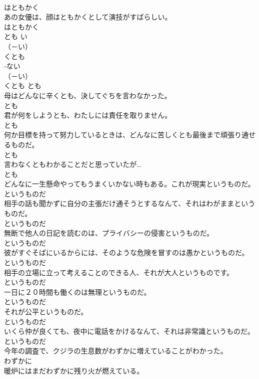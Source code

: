 \documentclass[8pt]{extreport}
\begin{document}
\begin{CJK}{UTF8}{min}
\\	はともかく
\\	あの女優は、顔はともかくとして演技がすばらしい。	
\\	はともかく
\\	とも	い
\\	（－い） 
\\	くとも	
\\	-ない
\\	（－い） 
\\	くとも	とも
\\	母はどんなに辛くとも、決してぐちを言わなかった。	
\\	とも
\\	君が何をしようとも、わたしには責任を取りません。	
\\	とも
\\	何か目標を持って努力しているときは、どんなに苦しくとも最後まで頑張り通せるものだ。	
\\	とも
\\	言わなくともわかることだと思っていたが…	
\\	とも
\\	どんなに一生懸命やってもうまくいかない時もある。これが現実というものだ。	
\\	というものだ
\\	相手の話も聞かずに自分の主張だけ通そうとするなんて、それはわがままというものだ。	
\\	というものだ
\\	無断で他人の日記を読むのは、プライバシーの侵害というものだ。	
\\	というものだ
\\	彼がすぐそばにいるからには、そのような危険を冒すのは愚かというものだ。	
\\	というものだ
\\	相手の立場に立って考えることのできる人、それが大人というものです。	
\\	というものだ
\\	一日に２０時間も働くのは無理というものだ。	
\\	というものだ
\\	それが公平というものだ。	
\\	というものだ
\\	いくら仲が良くても、夜中に電話をかけるなんて、それは非常識というものだ。	
\\	というものだ
\\	今年の調査で、クジラの生息数がわずかに増えていることがわかった。	
\\	わずかに
\\	暖炉にはまだわずかに残り火が燃えている。	

\end{CJK}
\end{document}
